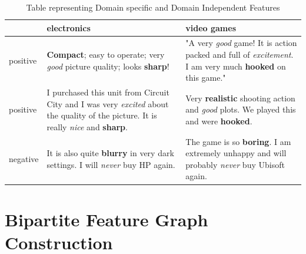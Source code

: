 \documentclass{report}
\begin{document}
\begin{table}[!h]
\centering
\begin{tabular}{|p{2cm}|p{7cm}|p{7cm}|}
\hline
         & electronics                                                                                                                   & video games                                                                                         \\ \hline
positive & \textbf{Compact}; easy to operate; very \emph{good} picture quality; looks \textbf{sharp}!                                                             & "A very \emph{good} game! It is action packed and full of \emph{excitement}. I am very much \textbf{hooked} on this game." \\ \hline
positive & I purchased this unit from Circuit City and I was very \emph{excited} about the quality of the picture. It is really \emph{nice} and \textbf{sharp}. & Very \textbf{realistic} shooting action and \emph{good} plots. We played this and were \textbf{hooked}.                       \\ \hline
negative & It is also quite \textbf{blurry} in very dark settings. I will \emph{never} buy HP again.                                                     & The game is so \textbf{boring}. I am extremely unhappy and will probably \emph{never} buy Ubisoft again.            \\ \hline
\end{tabular}

\caption{Table representing Domain specific and Domain Independent Features}
\label{my-label}
\end{table}

\section{Bipartite Feature Graph Construction}
\end{document}
